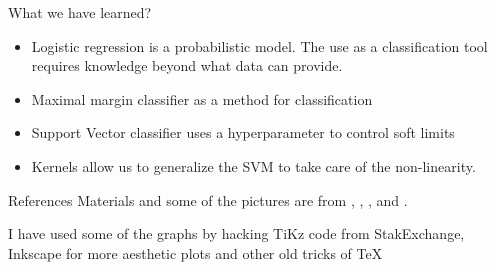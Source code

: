 \documentclass{beamer}
\begin{document}
\begin{frame}{What we have learned?	}
\begin{itemize}
	\item Logistic regression is a probabilistic model. The use as a classification tool requires knowledge beyond what data can provide.
	\item Maximal margin classifier as a method for classification
	\item Support Vector classifier uses a hyperparameter to control soft limits
	\item Kernels allow us to generalize the SVM to take care of the non-linearity.
\end{itemize}
\end{frame}

\begin{frame}{References}
	Materials and some of the pictures are from \citep{James2015}, \citep{hastie01}, \citep{geron2}, \citep{maindonald} and \citep{pestman}.
	\printbibliography 	
	
	I have used some of the graphs by hacking TiKz code from StakExchange, Inkscape for more aesthetic plots and other old tricks of \TeX
	
\end{frame}
\end{document}
